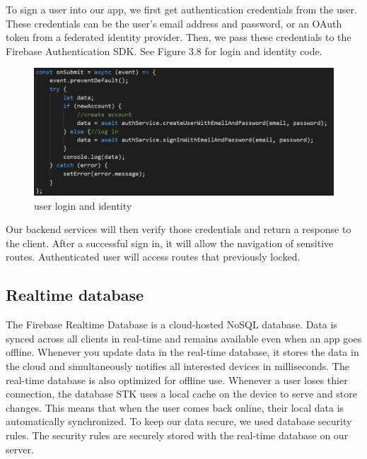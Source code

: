 \vspace{5mm}

To sign a user into our app, we first get authentication credentials from the user. 
These credentials can be the user's email address and password, or an OAuth token from a federated identity provider. Then, we pass these credentials to the Firebase Authentication SDK. See Figure 3.8 for login and identity code.\cite{fbauth}

\begin{figure}[ht]
    \centering
    \includegraphics[scale=0.55]{img/login.PNG}
    \caption{user login and identity}
    \label{fig:my_labe3}
\end{figure}

Our backend services will then verify those credentials and return a response to the client.
After a successful sign in, it will allow the navigation of sensitive routes.
Authenticated user will access routes that previously locked.


\subsection{Realtime database}

The Firebase Realtime Database is a cloud-hosted NoSQL database.
Data is synced across all clients in real-time and remains available even when an app goes offline.
Whenever you update data in the real-time database, it stores the data in the cloud and simultaneously notifies all interested devices in milliseconds. The real-time database is also optimized for offline use.
Whenever a user loses thier connection, the database STK uses a local cache on the device to serve and store changes. This means that when the user comes back online, their local data is automatically synchronized. To keep our data secure, we used database security rules.
The security rules are securely stored with the real-time database on our server.\cite{fbdb}

\vspace{13mm}

